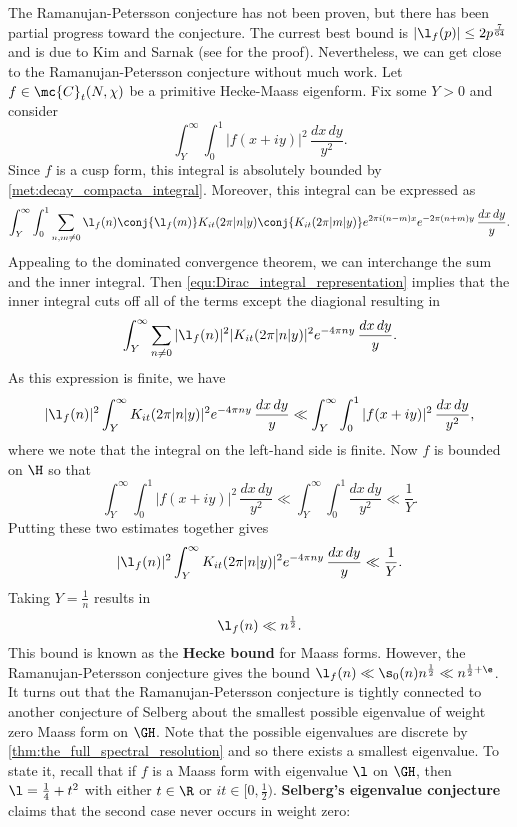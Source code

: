     The Ramanujan-Petersson conjecture has not been proven, but there has been partial progress toward the conjecture. The currest best bound is $|\l_{f}(p)| \le 2p^{\frac{7}{64}}$ and is due to Kim and Sarnak (see \cite{kim2003functoriality} for the proof). Nevertheless, we can get close to the Ramanujan-Petersson conjecture without much work. Let $f \in \mc{C}_{t}(N,\chi)$ be a primitive Hecke-Maass eigenform. Fix some $Y > 0$ and consider
    \[
      \int_{Y}^{\infty}\int_{0}^{1}|f(x+iy)|^{2}\,\frac{dx\,dy}{y^{2}}.
    \]
    Since $f$ is a cusp form, this integral is absolutely bounded by \cref{met:decay_compacta_integral}.
    Moreover, this integral can be expressed as
    \[
      \int_{Y}^{\infty}\int_{0}^{1}\sum_{n,m \neq 0}\l_{f}(n)\conj{\l_{f}(m)}K_{it}(2\pi|n|y)\conj{K_{it}(2\pi|m|y)}e^{2\pi i(n-m)x}e^{-2\pi(n+m)y}\,\frac{dx\,dy}{y}.
    \]
    Appealing to the dominated convergence theorem, we can interchange the sum and the inner integral. Then \cref{equ:Dirac_integral_representation} implies that the inner integral cuts off all of the terms except the diagional resulting in
    \[
      \int_{Y}^{\infty}\sum_{n \neq 0}|\l_{f}(n)|^{2}|K_{it}(2\pi|n|y)|^{2}e^{-4\pi ny}\,\frac{dx\,dy}{y}.
    \]
    As this expression is finite, we have
    \[
      |\l_{f}(n)|^{2}\int_{Y}^{\infty}K_{it}(2\pi|n|y)|^{2}e^{-4\pi ny}\,\frac{dx\,dy}{y} \ll \int_{Y}^{\infty}\int_{0}^{1}|f(x+iy)|^{2}\,\frac{dx\,dy}{y^{2}},
    \]
    where we note that the integral on the left-hand side is finite. Now $f$ is bounded on $\H$ so that
    \[
      \int_{Y}^{\infty}\int_{0}^{1}|f(x+iy)|^{2}\,\frac{dx\,dy}{y^{2}} \ll \int_{Y}^{\infty}\int_{0}^{1}\frac{dx\,dy}{y^{2}} \ll \frac{1}{Y}.
    \]
    Putting these two estimates together gives
    \[
      |\l_{f}(n)|^{2}\int_{Y}^{\infty}K_{it}(2\pi|n|y)|^{2}e^{-4\pi ny}\,\frac{dx\,dy}{y} \ll \frac{1}{Y}.
    \]
    Taking $Y = \frac{1}{n}$ results in
    \[
      \l_{f}(n) \ll n^{\frac{1}{2}}.
    \]
    This bound is known as the \textbf{Hecke bound} for Maass forms. However, the Ramanujan-Petersson conjecture gives the bound $\l_{f}(n) \ll \s_{0}(n)n^{\frac{1}{2}} \ll n^{\frac{1}{2}+\e}$. It turns out that the Ramanujan-Petersson conjecture is tightly connected to another conjecture of Selberg about the smallest possible eigenvalue of weight zero Maass form on $\GH$. Note that the possible eigenvalues are discrete by \cref{thm:the_full_spectral_resolution} and so there exists a smallest eigenvalue. To state it, recall that if $f$ is a Maass form with eigenvalue $\l$ on $\GH$, then $\l = \frac{1}{4}+t^{2}$ with either $t \in \R$ or $it \in [0,\frac{1}{2})$. \textbf{Selberg's eigenvalue conjecture} claims that the second case never occurs in weight zero:

